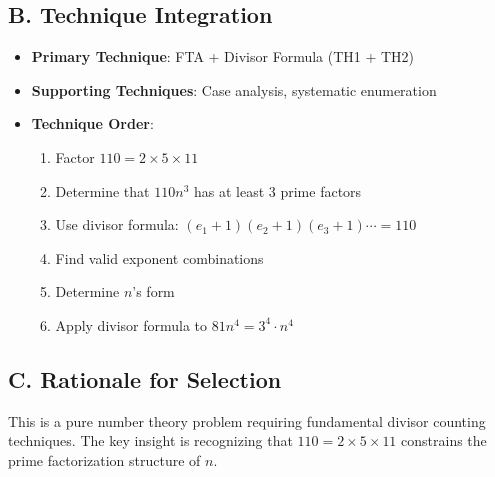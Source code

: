 \documentclass[]{article}
\begin{document}
\begin{techniquesbox}
\subsection*{B. Technique Integration}
\begin{itemize}[leftmargin=*]
    \item \textbf{Primary Technique}: FTA + Divisor Formula (TH1 + TH2)
    \item \textbf{Supporting Techniques}: Case analysis, systematic enumeration
    \item \textbf{Technique Order}:
    \begin{enumerate}
        \item Factor $110 = 2 \times 5 \times 11$
        \item Determine that $110n^3$ has at least 3 prime factors
        \item Use divisor formula: $(e_1+1)(e_2+1)(e_3+1) \cdots = 110$
        \item Find valid exponent combinations
        \item Determine $n$'s form
        \item Apply divisor formula to $81n^4 = 3^4 \cdot n^4$
    \end{enumerate}
\end{itemize}

\subsection*{C. Rationale for Selection}
This is a pure number theory problem requiring fundamental divisor counting techniques. The key insight is recognizing that $110 = 2 \times 5 \times 11$ constrains the prime factorization structure of $n$.
\end{techniquesbox}
\end{document}
